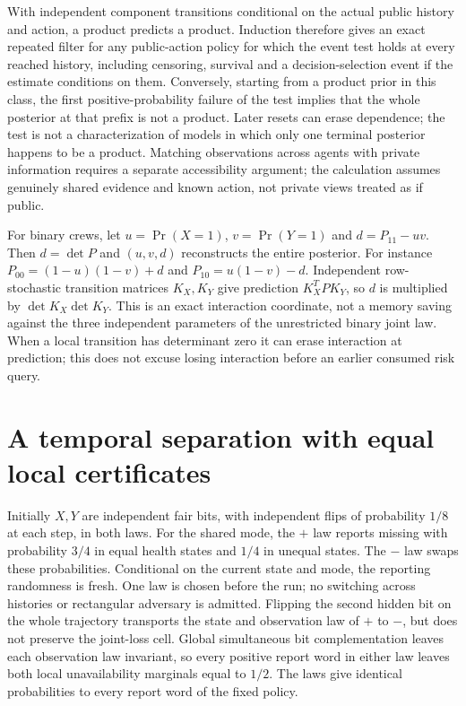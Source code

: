\documentclass[11pt]{article}
\begin{document}
With independent component transitions conditional on the actual public history and action, a product predicts a product. Induction therefore gives an exact repeated filter for any public-action policy for which the event test holds at every reached history, including censoring, survival and a decision-selection event if the estimate conditions on them. Conversely, starting from a product prior in this class, the first positive-probability failure of the test implies that the whole posterior at that prefix is not a product. Later resets can erase dependence; the test is not a characterization of models in which only one terminal posterior happens to be a product. Matching observations across agents with private information requires a separate accessibility argument; the calculation assumes genuinely shared evidence and known action, not private views treated as if public.

For binary crews, let $u=\Pr(X=1)$, $v=\Pr(Y=1)$ and $d=P_{11}-uv$. Then $d=\det P$ and $(u,v,d)$ reconstructs the entire posterior. For instance $P_{00}=(1-u)(1-v)+d$ and $P_{10}=u(1-v)-d$. Independent row-stochastic transition matrices $K_X,K_Y$ give prediction $K_X^T P K_Y$, so $d$ is multiplied by $\det K_X\det K_Y$. This is an exact interaction coordinate, not a memory saving against the three independent parameters of the unrestricted binary joint law. When a local transition has determinant zero it can erase interaction at prediction; this does not excuse losing interaction before an earlier consumed risk query.

\section{A temporal separation with equal local certificates}
Initially $X,Y$ are independent fair bits, with independent flips of probability $1/8$ at each step, in both laws. For the shared mode, the $+$ law reports missing with probability $3/4$ in equal health states and $1/4$ in unequal states. The $-$ law swaps these probabilities. Conditional on the current state and mode, the reporting randomness is fresh. One law is chosen before the run; no switching across histories or rectangular adversary is admitted. Flipping the second hidden bit on the whole trajectory transports the state and observation law of $+$ to $-$, but does not preserve the joint-loss cell. Global simultaneous bit complementation leaves each observation law invariant, so every positive report word in either law leaves both local unavailability marginals equal to $1/2$. The laws give identical probabilities to every report word of the fixed policy.
\end{document}
